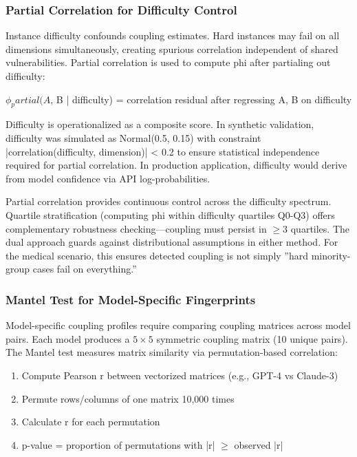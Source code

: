 \subsubsection{Partial Correlation for Difficulty Control}

Instance difficulty confounds coupling estimates. Hard instances may fail on all dimensions simultaneously, creating spurious correlation independent of shared vulnerabilities. Partial correlation is used to compute phi after partialing out difficulty:

$\phi _partial(A$, B | difficulty) = correlation residual after regressing A, B on difficulty

Difficulty is operationalized as a composite score. In synthetic validation, difficulty was simulated as Normal(0.5, 0.15) with constraint |correlation(difficulty, dimension)| < 0.2 to ensure statistical independence required for partial correlation. In production application, difficulty would derive from model confidence via API log-probabilities.

Partial correlation provides continuous control across the difficulty spectrum. Quartile stratification (computing phi within difficulty quartiles Q0-Q3) offers complementary robustness checking---coupling must persist in $\geq 3$ quartiles. The dual approach guards against distributional assumptions in either method. For the medical scenario, this ensures detected coupling is not simply ''hard minority-group cases fail on everything.''

\subsubsection{Mantel Test for Model-Specific Fingerprints}

Model-specific coupling profiles require comparing coupling matrices across model pairs. Each model produces a $5\times 5$ symmetric coupling matrix (10 unique pairs). The Mantel test measures matrix similarity via permutation-based correlation:

\begin{enumerate}
\item Compute Pearson r between vectorized matrices (e.g., GPT-4 vs Claude-3)
\item Permute rows/columns of one matrix 10,000 times
\item Calculate r for each permutation
\item p-value = proportion of permutations with |r| $\geq$ observed |r|
\end{enumerate}

